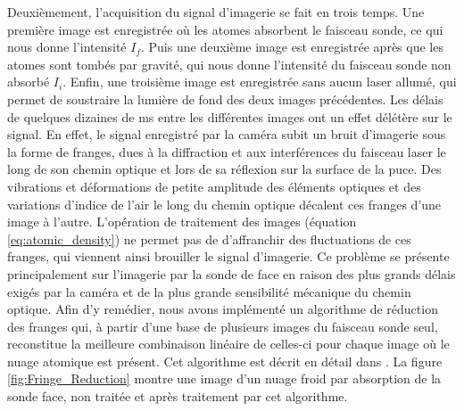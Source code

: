 Deuxièmement, l'acquisition du signal d'imagerie se fait en trois temps.
Une première image est enregistrée où les atomes absorbent le faisceau sonde, ce qui nous donne l'intensité $I_f$.
Puis une deuxième image est enregistrée après que les atomes sont tombés par gravité, qui nous donne l'intensité du faisceau sonde non absorbé $I_i$.
Enfin, une troisième image est enregistrée sans aucun laser allumé, qui permet de soustraire la lumière de fond
des deux images précédentes.
Les délais de quelques dizaines de \si{\ms} entre les différentes images ont un effet délétère sur le signal.
En effet, le signal enregistré par la caméra subit un bruit d'imagerie sous la forme de franges, dues à la diffraction et aux interférences du faisceau laser le long de son chemin optique et lors de sa réflexion sur la surface de la puce.
Des vibrations et déformations de petite amplitude des éléments optiques et des variations d'indice de l'air le long du chemin optique décalent ces franges d'une image à l'autre.
L'opération de traitement des images (équation \ref{eq:atomic_density}) ne permet pas de d'affranchir des fluctuations de ces franges, qui viennent ainsi brouiller le signal d'imagerie.
Ce problème se présente principalement sur l'imagerie par la sonde de face en raison des plus grands délais exigés par la caméra et de la plus grande sensibilité mécanique du chemin optique.
Afin d'y remédier, nous avons implémenté un algorithme de réduction des franges qui, à partir d'une base de plusieurs images du faisceau sonde seul, reconstitue la meilleure combinaison linéaire de celles-ci pour chaque image où le nuage atomique est présent. Cet algorithme est décrit en détail dans \cite{MX_WHITLOCK_FRINGEREDUCTION}.
La figure \eqref{fig:Fringe_Reduction} montre une image d'un nuage froid par absorption de la sonde face, non traitée et après traitement par cet algorithme.

